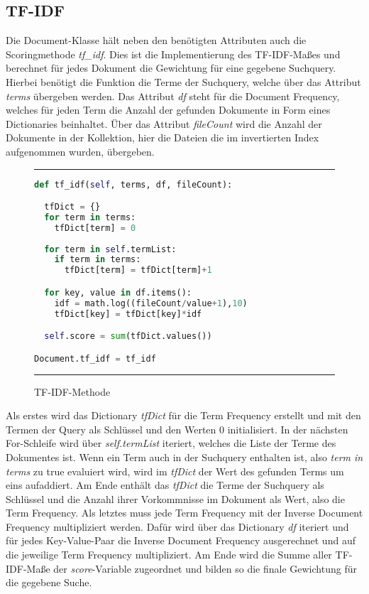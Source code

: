 \subsection{TF-IDF}\label{tf-idf}

Die Document-Klasse hält neben den benötigten Attributen auch die Scoringmethode \textit{tf\_idf}. Dies ist die Implementierung des TF-IDF-Maßes und berechnet für jedes Dokument die Gewichtung für eine gegebene Suchquery. Hierbei benötigt die Funktion die Terme der Suchquery, welche über das Attribut \textit{terms} übergeben werden. Das Attribut \textit{df} steht für die Document Frequency, welches für jeden Term die Anzahl der gefunden Dokumente in Form eines Dictionaries beinhaltet. Über das Attribut \textit{fileCount} wird die Anzahl der Dokumente in der Kollektion, hier die Dateien die im invertierten Index aufgenommen wurden, übergeben.

\begin{figure}
	\rule{\textwidth}{0.4pt}
		\begin{lstlisting}[language=Python]
def tf_idf(self, terms, df, fileCount):

  tfDict = {}
  for term in terms:
    tfDict[term] = 0  
  
  for term in self.termList:
    if term in terms:
      tfDict[term] = tfDict[term]+1

  for key, value in df.items():
    idf = math.log((fileCount/value+1),10)
    tfDict[key] = tfDict[key]*idf

  self.score = sum(tfDict.values())

Document.tf_idf = tf_idf
		\end{lstlisting}
	\rule{\textwidth}{0.4pt}
	\caption{TF-IDF-Methode}
	\label{fig:tfidf}
\end{figure}

Als erstes wird das Dictionary \textit{tfDict} für die Term Frequency erstellt und mit den Termen der Query als Schlüssel und den Werten 0 initialisiert. In der nächsten For-Schleife wird über \textit{self.termList} iteriert, welches die Liste der Terme des Dokumentes ist. Wenn ein Term auch in der Suchquery enthalten ist, also \textit{term in terms} zu true evaluiert wird, wird im \textit{tfDict} der Wert des gefunden Terms um eins aufaddiert. Am Ende enthält das \textit{tfDict} die Terme der Suchquery als Schlüssel und die Anzahl ihrer Vorkommnisse im Dokument als Wert, also die Term Frequency. Als letztes muss jede Term Frequency mit der Inverse Document Frequency multipliziert werden. Dafür wird über das Dictionary \textit{df} iteriert und für jedes Key-Value-Paar die Inverse Document Frequency ausgerechnet und auf die jeweilige Term Frequency multipliziert. Am Ende wird die Summe aller TF-IDF-Maße der \textit{score}-Variable zugeordnet und bilden so die finale Gewichtung für die gegebene Suche.

